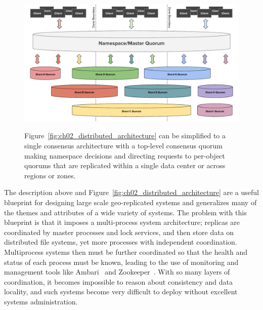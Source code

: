 \begin{figure}
    \begin{center}
        \includegraphics[width=5in]{figures/ch02_simplified_distributed_consensus_alt.pdf}
    \end{center}
    \renewcommand{\baselinestretch}{1}
    \small\normalsize

    \begin{quote}
        \caption[A Simplified Geo-Distributed Consensus Blueprint]{Figure~\ref{fig:ch02_distributed_architecture} can be simplified to a single consensus architecture with a top-level consensus quorum making namespace decisions and directing requests to per-object quorums that are replicated within a single data center or across regions or zones.}
        \label{fig:ch02_simplified_distributed_consensus}
    \end{quote}
\end{figure}
\renewcommand{\baselinestretch}{2}
\small\normalsize

The description above and Figure~\ref{fig:ch02_distributed_architecture} are a useful blueprint for designing large scale geo-replicated systems and generalizes many of the themes and attributes of a wide variety of systems.
The problem with this blueprint is that it imposes a multi-process system architecture; replicas are coordinated by master processes and lock services, and then store data on distributed file systems, yet more processes with independent coordination.
Multiprocess systems then must be further coordinated so that the health and status of each process must be known, leading to the use of monitoring and management tools like Ambari~\cite{ambari} and Zookeeper~\cite{zookeeper}.
With so many layers of coordination, it becomes impossible to reason about consistency and data locality, and such systems become very difficult to deploy without excellent systems administration.

